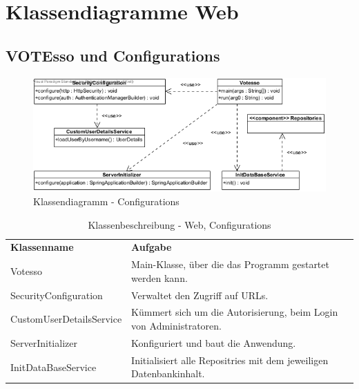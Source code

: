 \section{Klassendiagramme Web}
\subsection{VOTEsso und Configurations}
\begin{figure}[htp]
	\centering
	\includegraphics[width=\textwidth]{img/classvotesso.png}	
	\caption{Klassendiagramm - Configurations}
	\label{fig:klassendiagramm-vote}
\end{figure}

\begin{table}[htp]
	\centering
	\begin{tabularx}{\textwidth}{X X}
		\rowcolor[HTML]{C0C0C0} 
		\textbf{Klassenname} & \textbf{Aufgabe} \\
		Votesso & Main-Klasse, über die das Programm gestartet werden kann. \\
		\rowcolor[HTML]{E7E7E7}
		SecurityConfiguration & Verwaltet den Zugriff auf URLs.   \\
		 CustomUserDetailsService &  Kümmert sich um die Autorisierung, beim Login von Administratoren. \\
		 \rowcolor[HTML]{E7E7E7}
		ServerInitializer & Konfiguriert und baut die Anwendung. \\
		InitDataBaseService & Initialisiert alle Repositries mit dem jeweiligen Datenbankinhalt.  \\
	\end{tabularx}
	\caption{Klassenbeschreibung - Web, Configurations}
	\label{table:klassenbeschreibung-web-configurations}
\end{table}


